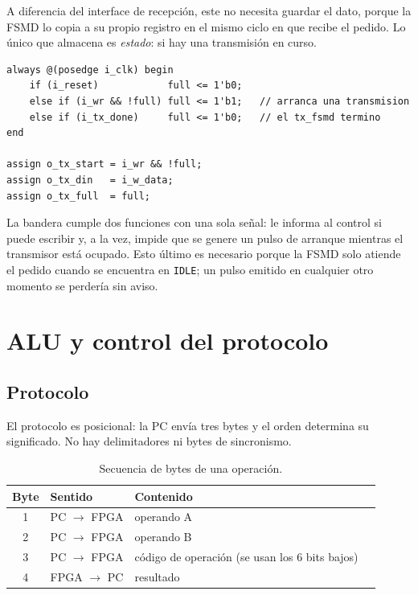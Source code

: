 \documentclass[12pt,a4paper]{article}
\begin{document}
A diferencia del interface de recepción, este no necesita guardar el dato,
porque la FSMD lo copia a su propio registro en el mismo ciclo en que recibe el
pedido. Lo único que almacena es \emph{estado}: si hay una transmisión en curso.

\begin{lstlisting}[caption={Bandera de ocupado del transmisor.}]
always @(posedge i_clk) begin
    if (i_reset)            full <= 1'b0;
    else if (i_wr && !full) full <= 1'b1;   // arranca una transmision
    else if (i_tx_done)     full <= 1'b0;   // el tx_fsmd termino
end

assign o_tx_start = i_wr && !full;
assign o_tx_din   = i_w_data;
assign o_tx_full  = full;
\end{lstlisting}

La bandera cumple dos funciones con una sola señal: le informa al control si
puede escribir y, a la vez, impide que se genere un pulso de arranque mientras
el transmisor está ocupado. Esto último es necesario porque la FSMD solo atiende
el pedido cuando se encuentra en \texttt{IDLE}; un pulso emitido en cualquier
otro momento se perdería sin aviso.

\section{ALU y control del protocolo}

\subsection{Protocolo}

El protocolo es posicional: la PC envía tres bytes y el orden determina su
significado. No hay delimitadores ni bytes de sincronismo.

\begin{table}[H]
  \centering
  \small
  \begin{tabular}{@{}clll@{}}
    \toprule
    \textbf{Byte} & \textbf{Sentido} & \textbf{Contenido} \\
    \midrule
    1 & PC $\rightarrow$ FPGA & operando A \\
    2 & PC $\rightarrow$ FPGA & operando B \\
    3 & PC $\rightarrow$ FPGA & código de operación (se usan los 6 bits bajos) \\
    4 & FPGA $\rightarrow$ PC & resultado \\
    \bottomrule
  \end{tabular}
  \caption{Secuencia de bytes de una operación.}
\end{table}
\end{document}
